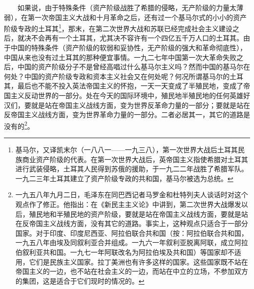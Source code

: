 \documentclass[cn,11pt,chinese]{elegantbook}
\begin{document}
　　如果说，由于特殊条件（资产阶级战胜了希腊的侵略，无产阶级的力量太薄弱），在第一次帝国主义大战和十月革命之后，还有过一个基马尔式的小小的资产阶级专政的土耳其\footnote[16]{ 基马尔，又译凯末尔（一八八一——一九三八），第一次世界大战后土耳其民族商业资产阶级的代表。在第一次世界大战后，英帝国主义指使希腊对土耳其进行武装侵略，土耳其人民得到苏俄的援助，于一九二二年战胜了希腊军队。一九二三年土耳其建立了资产阶级专政的共和国，基马尔被选为总统。}，那末，在第二次世界大战和苏联已经完成社会主义建设之后，就决不会再有一个土耳其，尤其决不容许有一个四亿五千万人口的土耳其。由于中国的特殊条件（资产阶级的软弱和妥协性，无产阶级的强大和革命彻底性），中国从来也没有过土耳其的那种便宜事情。一九二七年中国第一次大革命失败之后，中国的资产阶级分子不是曾经高唱过什么基马尔主义吗？然而中国的基马尔在何处？中国的资产阶级专政和资本主义社会又在何处呢？何况所谓基马尔的土耳其，最后也不能不投入英法帝国主义的怀抱，一天一天变成了半殖民地，变成了帝国主义反动世界的一部分。处在今天的国际环境中，殖民地半殖民地的任何英雄好汉们，要就是站在帝国主义战线方面，变为世界反革命力量的一部分；要就是站在反帝国主义战线方面，变为世界革命力量的一部分。二者必居其一，其它的道路是没有的\footnote[17]{ 一九五八年九月二日，毛泽东在同巴西记者马罗金和杜特列夫人谈话时对这个观点作了修正。他指出：在《新民主主义论》中讲到，第二次世界大战爆发以后，殖民地和半殖民地的资产阶级，要就是站在帝国主义战线方面，要就是站在反帝国主义战线方面，没有其它的道路。事实上，这种观点只适合于一部分国家。对于印度、印度尼西亚、阿拉伯联合共和国（按：阿拉伯联合共和国，一九五八年由埃及同叙利亚合并组成。一九六一年叙利亚脱离阿联，成立阿拉伯叙利亚共和国。一九七一年阿联改名为阿拉伯埃及共和国）等国家却不适用，它们是民族主义国家。拉丁美洲也有许多这样的国家。这些国家既不站在帝国主义的一边，也不站在社会主义的一边，而站在中立的立场，不参加双方的集团，这是适合于它们现时的情况的。}。\\
\end{document}
